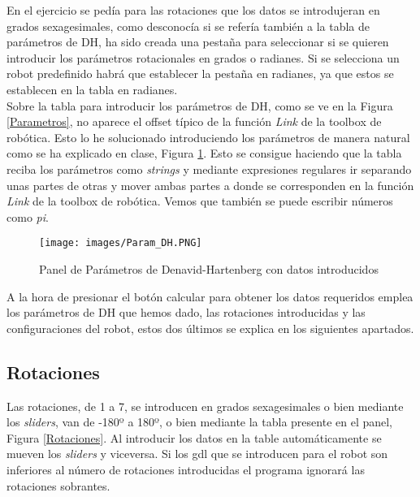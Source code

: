 \documentclass[a4paper, fontsize=11pt]{scrartcl} %
\numberwithin{equation}{section} %
\numberwithin{figure}{section} %
\numberwithin{table}{section} %
\begin{document}
	En el ejercicio se pedía para las rotaciones que los datos se introdujeran en grados sexagesimales, como desconocía si se refería también a la tabla de parámetros de DH, ha sido creada una pestaña para seleccionar si se quieren introducir los parámetros rotacionales en grados o radianes. Si se selecciona un robot predefinido habrá que establecer la pestaña en radianes, ya que estos se establecen en la tabla en radianes.\\
	
	Sobre la tabla para introducir los parámetros de DH, como se ve en la Figura \ref{Parametros}, no aparece el offset típico de la función \textit{Link} de la toolbox de robótica. Esto lo he solucionado introduciendo los parámetros de manera natural como se ha explicado en clase, Figura \ref{Parametros_DH}. Esto se consigue haciendo que la tabla reciba los parámetros como \textit{strings} y mediante expresiones regulares ir separando unas partes de otras y mover ambas partes a donde se corresponden en la función \textit{Link} de la toolbox de robótica. Vemos que también se puede escribir números como \textit{pi}.\\
	
	\begin{figure}[h!]
		\centering
		\texttt{[image: images/Param\_DH.PNG]}
		\caption{Panel de Parámetros de Denavid-Hartenberg con datos introducidos}
		\label{Parametros_DH}
	\end{figure}
	\FloatBarrier
	
	A la hora de presionar el botón calcular para obtener los datos requeridos emplea los parámetros de DH que hemos dado, las rotaciones introducidas y las configuraciones del robot, estos dos últimos se explica en los siguientes apartados.\\
	
	\subsection{Rotaciones}
	
	Las rotaciones, de 1 a 7, se introducen en grados sexagesimales o bien mediante los \textit{sliders}, van de -180º a 180º, o bien mediante la tabla presente en el panel, Figura \ref{Rotaciones}. Al introducir los datos en la table automáticamente se mueven los \textit{sliders} y viceversa. Si los gdl que se introducen para el robot son inferiores al número de rotaciones introducidas el programa ignorará las rotaciones sobrantes.\\
	
\end{document}
